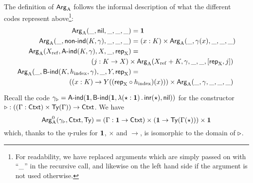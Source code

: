 \documentclass{article}
\begin{document}
The definition of $\mathsf{Arg}_{\mathrm{A}}$ follows the informal description of what the
different codes represent above\footnote{For readability, we have
  replaced arguments which are simply passed on with ``$\_$'' in
  the recursive call, and likewise on the left hand side if the
  argument is not used otherwise.}:
%
\begin{align*}%
  \ArgA(\omitt, \nilA, \omitt, \omitt, \omitt) &= \one \\
  \ArgA(\omitt, \nonindA(K, \gamma), \omitt, \omitt, \omitt) &= (x : K) \times \ArgA(\omitt, \gamma(x), \omitt, \omitt, \omitt) \\
  \ArgA(\Xref, \AindA(K, \gamma), \A, \omitt, \repA) &=  \\
\multispan{2}{\hfill $(j : K \to \A) \times \ArgA(\Xref + K, \gamma, \omitt, \omitt, [\repA, j])$} \\
  \ArgA(\omitt, \BindA(K, \hindex, \gamma), \omitt, \B, \repA) &= \\
\multispan{2}{\hfill $((x : K) \to \B((\repA \circ \hindex)(x))) \times \ArgA(\omitt, \gamma, \omitt, \omitt, \omitt)$}
\end{align*}


\begin{example}
  Recall the code $\gamma_{\triangleright} = \mathsf{A}\text{-}\mathsf{ind}(\mathbf{1}, \mathsf{B}\text{-}\mathsf{ind}(\mathbf{1},
  \lambda (\star : \mathbf{1})\,.\,\mathsf{inr}(\star), \mathsf{nil}))$ for the
  constructor $\triangleright : ((\Gamma : \mathsf{Ctxt}) \times \mathsf{Ty}(\Gamma)) \to
  \mathsf{Ctxt}$. We have 
\[
\mathsf{Arg}^{0}_{\mathrm{A}}(\gamma_{\triangleright}, \mathsf{Ctxt}, \mathsf{Ty}) = (\Gamma : \mathbf{1} \to \mathsf{Ctxt})
\times (\mathbf{1} \to \mathsf{Ty}(\Gamma(\star))) \times \mathbf{1}
\]
which, thanks to the $\eta$-rules for $\mathbf{1}$, $\times$ and $\to$, is isomorphic to the
domain of $\triangleright$. 
\blackqed
\end{example}
\end{document}
